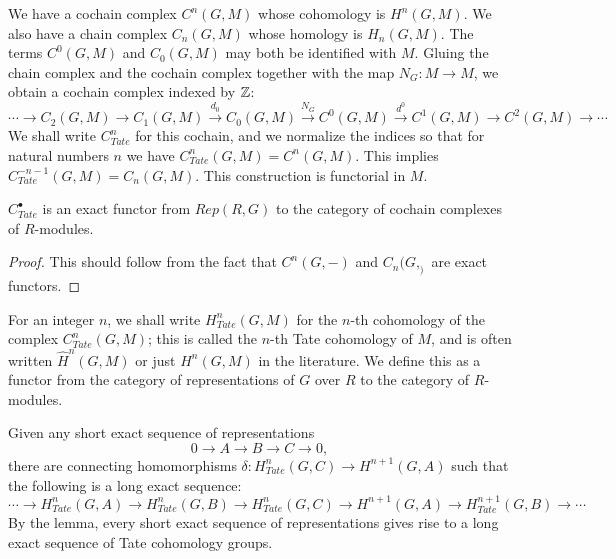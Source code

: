 \begin{definition}
	\label{def:Tate complex}
	\leanok
	We have a cochain complex $C^n(G,M)$ whose cohomology is $H^n(G,M)$.
	We also have a chain complex $C_n(G,M)$ whose homology is $H_n(G,M)$.
	The terms $C^0(G,M)$ and $C_0(G,M)$ may both be identified with $M$.
	Gluing the chain complex and the cochain complex together with the map $N_G : M \to M$, we obtain
	a cochain complex indexed by ${\mathbb Z}$:
	\[
		\cdots \to C_2(G,M) \to C_1(G,M) \stackrel{d_0}\to C_0(G,M)
		\stackrel{N_G}\to C^0(G,M) \stackrel{d^0}\to C^1(G,M) \to C^2(G,M) \to \cdots
	\]
	We shall write $C^n_{Tate}$ for this cochain, and we normalize the indices so that for
	natural numbers $n$ we have $C^n_{Tate}(G,M) = C^n(G,M)$. This implies
	$C^{-n-1}_{Tate}(G,M) = C_n(G,M)$.
	This construction is functorial in $M$.
\end{definition}

\begin{lemma}
	\label{lem:Tate complex exactness}
	\leanok
  $C^\bullet_{Tate}$ is an exact functor from $Rep(R,G)$ to the category
  of cochain complexes of $R$-modules.
\end{lemma}

\begin{proof}
	This should follow from the fact that $C^n(G,-)$ and $C_n(G,_)$ are exact functors.
\end{proof}


\begin{definition}
	\label{def:Tate cohomology}
	For an integer $n$, we shall write $H^n_{Tate}(G,M)$ for the $n$-th cohomology of the complex
	$C^n_{Tate}(G,M)$; this is called the $n$-th Tate cohomology of $M$,
	and is often written $\hat H^n(G,M)$ or just $H^n(G,M)$ in the literature.
	We define this as a functor from the category of representations of $G$ over $R$
	to the category of $R$-modules.
\end{definition}


\begin{definition}
	\label{def:Tate long exact sequence}
	\leanok
	Given any short exact sequence of representations
	\[
		0 \to A \to B \to C \to 0,
	\]
	there are connecting homomorphisms $\delta : H^n_{Tate}(G,C) \to H^{n+1}(G,A)$
	such that the following is a long exact sequence:
	\[
		\cdots \to H^n_{Tate}(G,A) \to H^n_{Tate}(G,B) \to H^n_{Tate}(G,C)
		\to H^{n+1}(G,A) \to H^{n+1}_{Tate}(G,B) \to \cdots
	\]
	By the lemma, every short exact sequence of representations gives rise to a long exact sequence
of Tate cohomology groups.
\end{definition}

